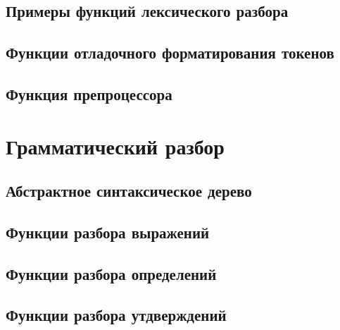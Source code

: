 \section*{Примеры функций лексического разбора}


\section*{Функции отладочного форматирования токенов}



\section*{Функция препроцессора}



\chapter{Грамматический разбор}
\section*{Абстрактное синтаксическое дерево}


\section*{Функции разбора выражений}


\section*{Функции разбора определений}


\section*{Функции разбора утдверждений}


